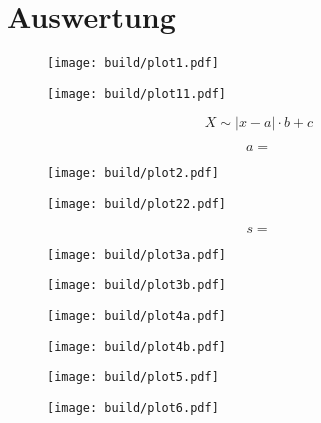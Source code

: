 \section{Auswertung}
\label{sec:auswertung}

\begin{figure}[H]
	\texttt{[image: build/plot1.pdf]}
\end{figure}

\begin{figure}[H]
	\texttt{[image: build/plot11.pdf]}
\end{figure}

\begin{equation*}
	X \sim |x - a| \cdot b + c
\end{equation*}

\begin{equation*}
	a = 
\end{equation*}

\begin{figure}[H]
	\texttt{[image: build/plot2.pdf]}
\end{figure}

\begin{figure}[H]
	\texttt{[image: build/plot22.pdf]}
\end{figure}

\begin{equation*}
	s = 
\end{equation*}

\begin{figure}[H]
	\texttt{[image: build/plot3a.pdf]}
\end{figure}

\begin{figure}[H]
	\texttt{[image: build/plot3b.pdf]}
\end{figure}

\begin{figure}[H]
	\texttt{[image: build/plot4a.pdf]}
\end{figure}

\begin{figure}[H]
	\texttt{[image: build/plot4b.pdf]}
\end{figure}

\begin{figure}[H]
	\texttt{[image: build/plot5.pdf]}
\end{figure}

\begin{figure}[H]
	\texttt{[image: build/plot6.pdf]}
\end{figure}

